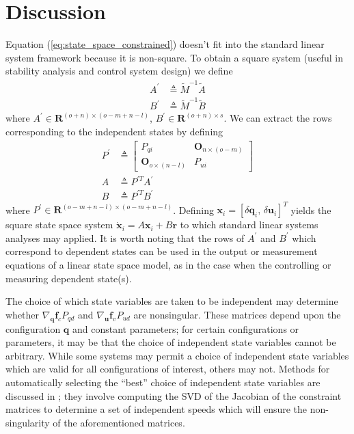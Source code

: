 \documentclass[smallcondensed]{svjour3}                     %
\begin{document}
\section{Discussion}
\label{sec:discussion}
Equation (\ref{eq:state_space_constrained}) doesn't fit into the standard linear
system framework because it is non-square.  To obtain a square system (useful
in stability analysis and control system design) we define
\begin{align}
  \label{eq:A_prime}
    A^\prime &\triangleq \tilde{M}^{-1} \tilde{A} \\
  \label{eq:B_prime}
    B^\prime &\triangleq \tilde{M}^{-1} \tilde{B}
\end{align}
where  $A^\prime \in \bm{R}^{(o + n) \times (o - m + n -l)}$, $B^\prime \in
\bm{R}^{(o + n) \times s}$.  We can extract the rows corresponding to the
independent states by defining
\begin{align}
  \label{eq:P_prime}
    P^\prime &\triangleq \begin{bmatrix}
        P_{qi} & \bm{O}_{n \times (o - m)} \\
        \bm{O}_{o \times (n - l)} & P_{ui}
    \end{bmatrix} \\
  \label{eq:A}
    A &\triangleq P^{\prime T} A^\prime \\
  \label{eq:B}
    B &\triangleq P^{\prime T} B^\prime
\end{align}
where $P^\prime \in \bm{R}^{(o - m + n - l) \times (o - m + n - l)}$.  Defining
$\bm{x}_i = \left[\delta\bm{q}_i,\,\delta\bm{u}_i\right]^{T}$ yields the square
state space system $\dot{\bm{x}}_i = A \bm{x}_i + B \bm{r}$ to which standard
linear systems analyses may applied.  It is worth noting that the rows
of $A^\prime$ and $B^\prime$ which correspond to dependent states can be used
in the output or measurement equations of a linear state space model, as in the
case when the controlling or measuring dependent state(s).

The choice of which state variables are taken to be independent may determine
whether $\nabla_{\bm{q}}\bm{f}_{c} P_{qd}$ and $\nabla_{\bm{u}} \bm{f}_{v}
P_{ud}$ are nonsingular.  These matrices depend upon the configuration $\bm{q}$
and constant parameters; for certain configurations or parameters, it may be
that the choice of independent state variables cannot be arbitrary.  While some
systems may permit a choice of independent state variables which are valid for
all configurations of interest, others may not.  Methods for automatically
selecting the ``best'' choice of independent state variables are discussed in
\cite{Reckdahl1996}; they involve computing the SVD of the Jacobian of the
constraint matrices to determine a set of independent speeds which will ensure
the non-singularity of the aforementioned matrices.
\end{document}
